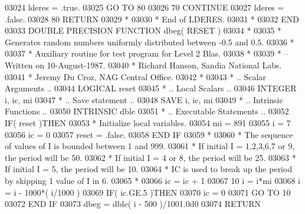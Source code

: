 \begin{DoxyCode}
03024       lderes = .true.
03025       \textcolor{keywordflow}{GO TO} 80
03026    70 \textcolor{keywordflow}{CONTINUE}
03027       lderes = .false.
03028    80 \textcolor{keywordflow}{RETURN}
03029 \textcolor{comment}{*}
03030 \textcolor{comment}{*     End of LDERES.}
03031 \textcolor{comment}{*}
03032 \textcolor{keyword}{      END}
03033 \textcolor{keyword}{      DOUBLE PRECISION }\textcolor{keyword}{FUNCTION }dbeg( RESET )
03034 \textcolor{comment}{*}
03035 \textcolor{comment}{*  Generates random numbers uniformly distributed between -0.5 and 0.5.}
03036 \textcolor{comment}{*}
03037 \textcolor{comment}{*  Auxiliary routine for test program for Level 2 Blas.}
03038 \textcolor{comment}{*}
03039 \textcolor{comment}{*  -- Written on 10-August-1987.}
03040 \textcolor{comment}{*     Richard Hanson, Sandia National Labs.}
03041 \textcolor{comment}{*     Jeremy Du Croz, NAG Central Office.}
03042 \textcolor{comment}{*}
03043 \textcolor{comment}{*     .. Scalar Arguments ..}
03044       \textcolor{keywordtype}{LOGICAL}            reset
03045 \textcolor{comment}{*     .. Local Scalars ..}
03046       \textcolor{keywordtype}{INTEGER}            i, ic, mi
03047 \textcolor{comment}{*     .. Save statement ..}
03048       \textcolor{keywordtype}{SAVE}               i, ic, mi
03049 \textcolor{comment}{*     .. Intrinsic Functions ..}
03050       \textcolor{keywordtype}{INTRINSIC}          dble
03051 \textcolor{comment}{*     .. Executable Statements ..}
03052       \textcolor{keywordflow}{IF}( reset )\textcolor{keywordflow}{THEN}
03053 \textcolor{comment}{*        Initialize local variables.}
03054          mi = 891
03055          i = 7
03056          ic = 0
03057          reset = .false.
03058 \textcolor{keywordflow}{      END IF}
03059 \textcolor{comment}{*}
03060 \textcolor{comment}{*     The sequence of values of I is bounded between 1 and 999.}
03061 \textcolor{comment}{*     If initial I = 1,2,3,6,7 or 9, the period will be 50.}
03062 \textcolor{comment}{*     If initial I = 4 or 8, the period will be 25.}
03063 \textcolor{comment}{*     If initial I = 5, the period will be 10.}
03064 \textcolor{comment}{*     IC is used to break up the period by skipping 1 value of I in 6.}
03065 \textcolor{comment}{*}
03066       ic = ic + 1
03067    10 i = i*mi
03068       i = i - 1000*( i/1000 )
03069       \textcolor{keywordflow}{IF}( ic.GE.5 )\textcolor{keywordflow}{THEN}
03070          ic = 0
03071          \textcolor{keywordflow}{GO TO} 10
03072 \textcolor{keywordflow}{      END IF}
03073       dbeg = dble( i - 500 )/1001.0d0
03074       \textcolor{keywordflow}{RETURN}

\end{DoxyCode}
